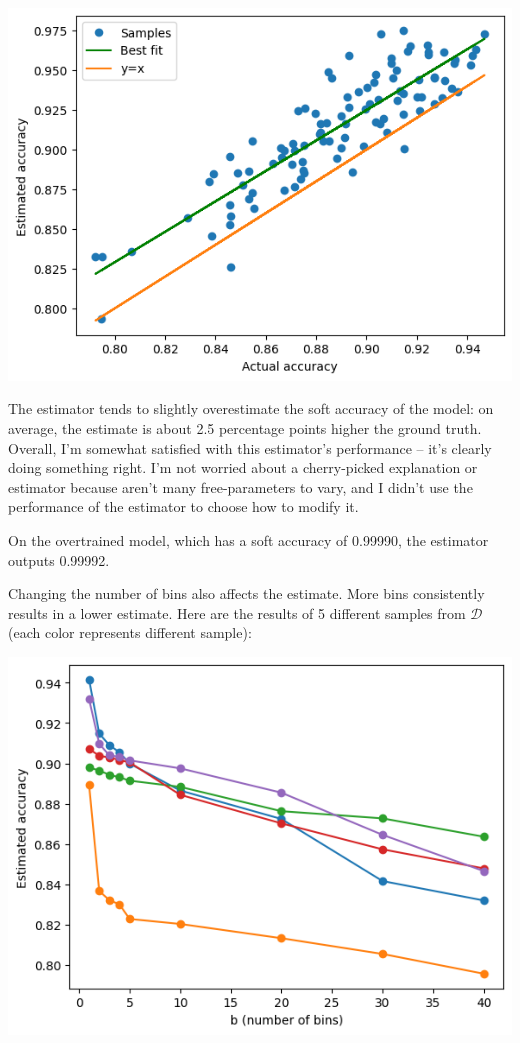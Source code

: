 \documentclass[12pt]{article}
\begin{document}
\includegraphics*[]{images/output.png}

The estimator tends to slightly overestimate the soft accuracy of the model: on average, the estimate is about 2.5 percentage points higher the ground truth. Overall, I'm somewhat satisfied with this estimator's performance -- it's clearly doing something right. I'm not worried about a cherry-picked explanation or estimator because aren't many free-parameters to vary, and I didn't use the performance of the estimator to choose how to modify it.

On the overtrained model, which has a soft accuracy of 0.99990, the estimator outputs 0.99992.

Changing the number of bins also affects the estimate. More bins consistently results in a lower estimate. Here are the results of 5 different samples from $\mathcal{D}$ (each color represents different sample):

\includegraphics*[]{images/bins.png}
\end{document}
